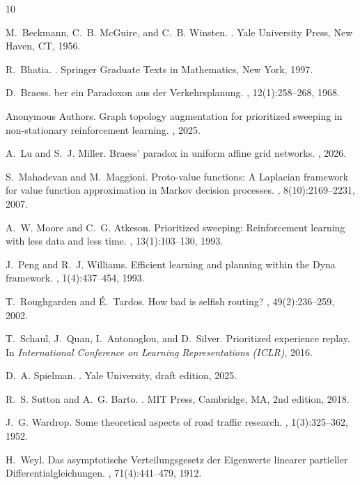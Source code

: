 \documentclass[11pt,a4paper]{article}
\begin{document}

\begin{thebibliography}{10}

M.~Beckmann, C.~B. McGuire, and C.~B. Winsten.
.
\newblock Yale University Press, New Haven, CT, 1956.

R.~Bhatia.
.
\newblock Springer Graduate Texts in Mathematics, New York, 1997.

D.~Braess.
ber ein {P}aradoxon aus der {V}erkehrsplanung.
, 12(1):258--268, 1968.

Anonymous Authors.
\newblock Graph topology augmentation for prioritized sweeping in non-stationary reinforcement learning.
, 2025.

A.~Lu and S.~J. Miller.
\newblock Braess' paradox in uniform affine grid networks.
, 2026.

S.~Mahadevan and M.~Maggioni.
\newblock Proto-value functions: A {L}aplacian framework for value function approximation in {M}arkov decision processes.
, 8(10):2169--2231, 2007.

A.~W. Moore and C.~G. Atkeson.
\newblock Prioritized sweeping: Reinforcement learning with less data and less time.
, 13(1):103--130, 1993.

J.~Peng and R.~J. Williams.
\newblock Efficient learning and planning within the Dyna framework.
, 1(4):437--454, 1993.

T.~Roughgarden and {\'E}.~Tardos.
\newblock How bad is selfish routing?
, 49(2):236--259, 2002.

T.~Schaul, J.~Quan, I.~Antonoglou, and D.~Silver.
\newblock Prioritized experience replay.
\newblock In {\em International Conference on Learning Representations (ICLR)}, 2016.

D.~A. Spielman.
.
\newblock Yale University, draft edition, 2025.

R.~S. Sutton and A.~G. Barto.
.
\newblock MIT Press, Cambridge, MA, 2nd edition, 2018.

J.~G. Wardrop.
\newblock Some theoretical aspects of road traffic research.
, 1(3):325--362, 1952.

H.~Weyl.
\newblock Das asymptotische {V}erteilungsgesetz der {E}igenwerte linearer partieller {D}ifferentialgleichungen.
, 71(4):441--479, 1912.

\end{thebibliography}
\end{document}
